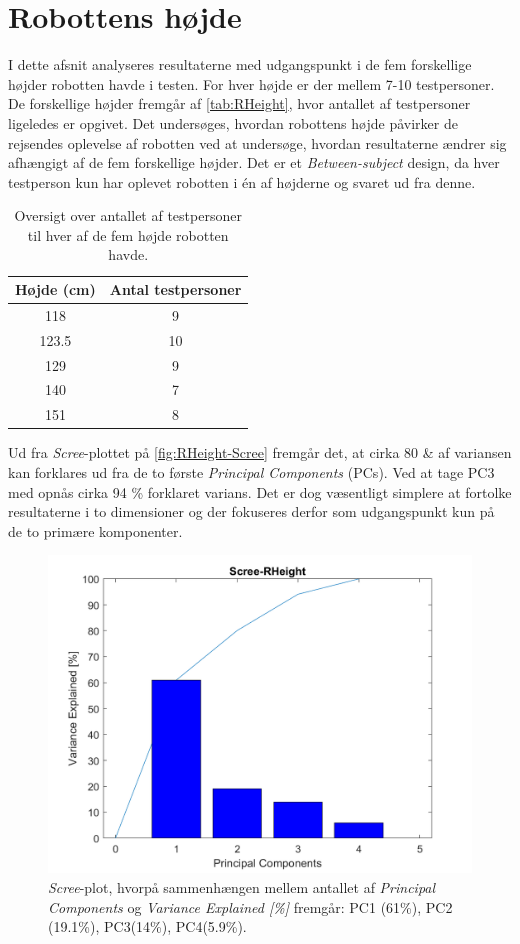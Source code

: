 \section{Robottens højde}
\label{DatabehandlingRHeight}
%
I dette afsnit analyseres resultaterne med udgangspunkt i de fem forskellige højder robotten havde i testen. For hver højde er der mellem 7-10 testpersoner. De forskellige højder fremgår af \autoref{tab:RHeight}, hvor antallet af testpersoner ligeledes er opgivet. Det undersøges, hvordan robottens højde påvirker de rejsendes oplevelse af robotten ved at undersøge, hvordan resultaterne ændrer sig afhængigt af de fem forskellige højder. Det er et \textit{Between-subject} design, da hver testperson kun har oplevet robotten i én af højderne og svaret ud fra denne.
%
\begin{table}[H]
\centering
\begin{tabular}{c|c}
Højde (cm) & Antal testpersoner \\ \hline
118   & 9     \\ \hline
123.5 & 10    \\ \hline
129   & 9     \\ \hline
140   & 7     \\ \hline
151   & 8      \\
\end{tabular}
\caption{Oversigt over antallet af testpersoner til hver af de fem højde robotten havde.}
\label{tab:RHeight}
\end{table}
\noindent
%
Ud fra \textit{Scree}-plottet på \autoref{fig:RHeight-Scree} fremgår det, at cirka 80 \& af variansen kan forklares ud fra de to første \textit{Principal Components} (PCs). Ved at tage PC3 med opnås cirka 94 \% forklaret varians. Det er dog væsentligt simplere at fortolke resultaterne i to dimensioner og der fokuseres derfor som udgangspunkt kun på de to primære komponenter.
%
\begin{figure}[H]
\centering
\includegraphics[width=\textwidth]{Figure/DatabehandlingSkalaer/PCAfigures/RHeight-Scree.png}
\caption{\textit{Scree}-plot, hvorpå sammenhængen mellem antallet af \textit{Principal Components} og \textit{Variance Explained [\%]} fremgår: PC1 (61\%), PC2 (19.1\%), PC3(14\%), PC4(5.9\%).}
\label{fig:RHeight-Scree}
\end{figure}
